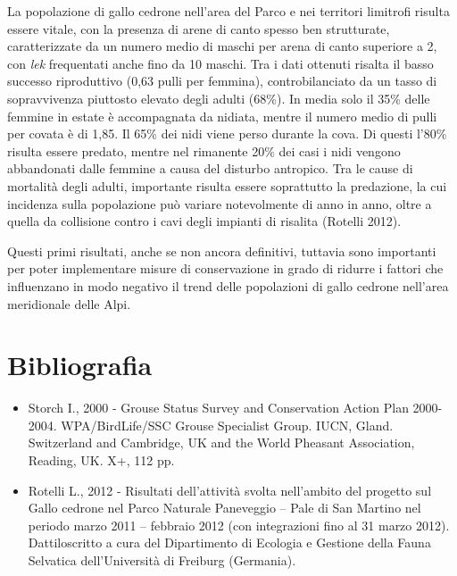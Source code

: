 {La popolazione di gallo cedrone
nell{\textquoteright}area del Parco e nei territori limitrofi risulta
essere vitale, con la presenza di arene di canto spesso ben
strutturate, caratterizzate da un numero medio di maschi per arena di
canto superiore a 2, con
}\textit{{lek}}{
frequentati anche fino da 10 maschi. Tra i dati ottenuti risalta il
basso successo riproduttivo (0,63 pulli per femmina), controbilanciato
da un tasso di sopravvivenza piuttosto elevato degli adulti (68\%). In
media solo il 35\% delle femmine in estate \`e accompagnata da nidiata,
mentre il numero medio di pulli per covata \`e di 1,85. Il 65\% dei
nidi viene perso durante la cova. Di questi l'80\%
risulta essere predato, mentre nel rimanente 20\% dei casi i nidi
vengono abbandonati dalle femmine a causa del disturbo antropico. Tra
le cause di mortalit\`a degli adulti, importante risulta essere
soprattutto la predazione, la cui incidenza sulla popolazione pu\`o
variare notevolmente di anno in anno, oltre a quella da collisione
contro i cavi degli impianti di risalita (Rotelli 2012). }

{Questi primi risultati, anche se non ancora
definitivi, tuttavia sono importanti per poter implementare misure di
conservazione in grado di ridurre i fattori che influenzano in modo
negativo il trend delle popolazioni di gallo cedrone
nell{\textquoteright}area meridionale delle Alpi.}

\section*{Bibliografia}
\begin{itemize}\itemsep0pt
	\item Storch I., 2000 - Grouse Status Survey and Conservation Action
Plan 2000-2004. WPA/BirdLife/SSC Grouse Specialist Group. IUCN, Gland.
Switzerland and Cambridge, UK and the World Pheasant Association,
Reading, UK. X+, 112 pp.

	\item Rotelli L., 2012 - Risultati dell{\textquoteright}attivit\`a
svolta nell{\textquoteright}ambito del progetto sul Gallo cedrone nel
Parco Naturale Paneveggio -- Pale di San Martino nel periodo marzo
2011 -- febbraio 2012 (con integrazioni fino al 31 marzo 2012).
Dattiloscritto a cura del Dipartimento di Ecologia e Gestione della
Fauna Selvatica dell{\textquoteright}Universit\`a di Freiburg
(Germania).
\end{itemize}

